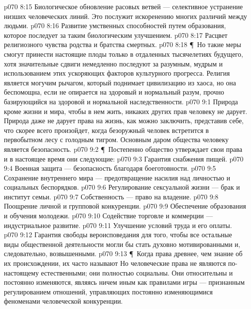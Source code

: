 \vs p070 8:15 \bibnobreakspace Биологическое обновление расовых ветвей --- селективное устранение низших человеческих линий. Это послужит искоренению многих различий между людьми.
\vs p070 8:16 \bibnobreakspace Развитие умственных способностей путем образования, которое последует за таким биологическим улучшением.
\vs p070 8:17 \bibnobreakspace Расцвет религиозного чувства родства и братства смертных.
\vs p070 8:18 \P\ Но такие меры смогут принести настоящие плоды только в отдаленных тысячелетиях будущего, хотя значительные сдвиги немедленно последуют за разумным, мудрым и  использованием этих ускоряющих факторов культурного прогресса. Религия является могучим рычагом, который поднимает цивилизацию из хаоса, но она беспомощна, если не опирается на здоровый и нормальный разум, прочно базирующийся на здоровой и нормальной наследственности.
\vs p070 9:1 Природа кроме жизни и мира, чтобы в нем жить, никаких других прав человеку не дарует. Природа даже не дарует права на жизнь, как можно заключить, представив себе, что скорее всего произойдет, когда безоружный человек встретится в первобытном лесу с голодным тигром. Основным даром общества человеку является безопасность.
\vs p070 9:2 \P\ Постепенно общество утверждает свои права и в настоящее время они следующие:
\vs p070 9:3 \bibnobreakspace Гарантия снабжения пищей.
\vs p070 9:4 \bibnobreakspace Военная защита --- безопасность благодаря боеготовности.
\vs p070 9:5 \bibnobreakspace Сохранение внутреннего мира --- предотвращение насилия над личностью и социальных беспорядков.
\vs p070 9:6 \bibnobreakspace Регулирование сексуальной жизни --- брак и институт семьи.
\vs p070 9:7 \bibnobreakspace Собственность --- право на владение.
\vs p070 9:8 \bibnobreakspace Поощрение личной и групповой конкуренции.
\vs p070 9:9 \bibnobreakspace Обеспечение образования и обучения молодежи.
\vs p070 9:10 \bibnobreakspace Содействие торговле и коммерции --- индустриальное развитие.
\vs p070 9:11 \bibnobreakspace Улучшение условий труда и его оплаты.
\vs p070 9:12 \bibnobreakspace Гарантия свободы вероисповедания для того, чтобы все остальные виды общественной деятельности могли бы стать духовно мотивированными и, следовательно, возвышенными.
\vs p070 9:13 \P\ Когда права древнее, чем знание об их происхождении, их часто называют  Но человеческие права не являются по\hyp{}настоящему естественными; они полностью социальны. Они относительны и постоянно изменяются, являясь ничем иным как правилами игры --- признанным регулированием отношений, управляющих постоянно изменяющимися феноменами человеческой конкуренции.
